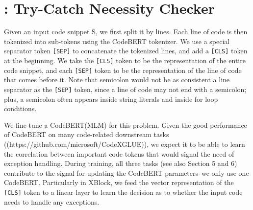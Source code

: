 \section{{\xblock}: Try-Catch Necessity Checker}
\label{detect:sec}

Given an input code snippet S, we first split it by lines. Each line of code is then tokenized into sub-tokens using the CodeBERT tokenizer. We use a special separator token \texttt{[SEP]} to concatenate the tokenized lines, and add a \texttt{[CLS]} token at the beginning. We take the \texttt{[CLS]} token to be the representation of the entire code snippet, and each \texttt{[SEP]} token to be the representation of the line of code that comes before it. Note that semicolon would not be as consistent a line separator as the \texttt{[SEP]} token, since a line of code may not end with a semicolon; plus, a semicolon often appears inside string literals and inside for loop conditions. 

We fine-tune a CodeBERT(MLM) for this problem. Given the good performance of CodeBERT on many code-related downstream tasks ((https://github.com/microsoft/CodeXGLUE)), we expect it to be able to learn the correlation between important code tokens that would signal the need of exception handling. During training, all three tasks (see also Section 5 and 6) contribute to the signal for updating the CodeBERT parameters–we only use one CodeBERT. Particularly in XBlock, we feed the vector representation of the \texttt{[CLS]} token to a linear layer to learn the decision as to whether the input code needs to handle any exceptions. 





